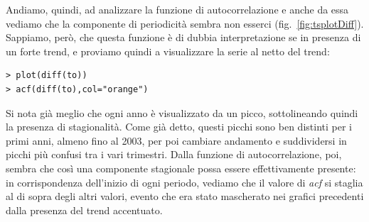 \documentclass[11pt,a4paper,oneside]{article}
\begin{document}
Andiamo, quindi, ad analizzare la funzione di autocorrelazione e anche da essa vediamo che la componente di periodicità sembra non esserci (fig.~\ref{fig:tsplotDiff}). Sappiamo, però, che questa funzione è di dubbia interpretazione se in presenza di un forte trend, e proviamo quindi a visualizzare la serie al netto del trend: 
\begin{verbatim}
> plot(diff(to))
> acf(diff(to),col="orange")
\end{verbatim}
Si nota già meglio che ogni anno è visualizzato da un picco, sottolineando quindi la presenza di stagionalità. Come già detto, questi picchi sono ben distinti per i primi anni, almeno fino al 2003, per poi cambiare andamento e suddividersi in picchi più confusi tra i vari trimestri. Dalla funzione di autocorrelazione, poi, sembra che così una componente stagionale possa essere effettivamente presente: in corrispondenza dell'inizio di ogni periodo, vediamo che il valore di \textit{acf} si staglia al di sopra degli altri valori, evento che era stato mascherato nei grafici precedenti dalla presenza del trend accentuato.
\begin{figure}[h]
\centering
{}
 \\
\caption{}
\label{fig:graficiDiff}
\end{figure}
\end{document}
